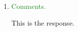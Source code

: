 \begin{enumerate}[labelwidth=!,labelindent=0pt,wide, label=\revcon{1}{\arabic*}]
\item \textcolor{ForestGreen}{Comments.}

\resp{} This is the response.




\sepline


\end{enumerate}

